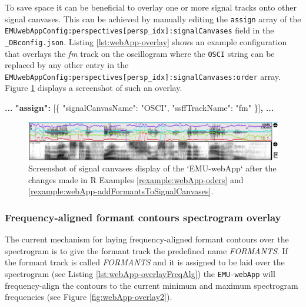 \documentclass[]{book}
\newenvironment{Shaded}{\begin{snugshade}}{\end{snugshade}}
\newcommand{\DataTypeTok}[1]{\textcolor[rgb]{0.13,0.29,0.53}{#1}}
\newcommand{\ErrorTok}[1]{\textcolor[rgb]{0.64,0.00,0.00}{\textbf{#1}}}
\newcommand{\FunctionTok}[1]{\textcolor[rgb]{0.00,0.00,0.00}{#1}}
\newcommand{\OtherTok}[1]{\textcolor[rgb]{0.56,0.35,0.01}{#1}}
\newcommand{\StringTok}[1]{\textcolor[rgb]{0.31,0.60,0.02}{#1}}
\theoremstyle{definition}
\theoremstyle{definition}
\theoremstyle{definition}
\theoremstyle{remark}
\begin{document}
To save space it can be beneficial to overlay one or more signal tracks
onto other signal canvases. This can be achieved by manually editing the
\texttt{assign} array of the
\texttt{EMUwebAppConfig:perspectives{[}persp\_idx{]}:signalCanvases}
field in the \texttt{\_DBconfig.json}. Listing \ref{lst:webApp-overlay}
shows an example configuration that overlays the \emph{fm} track on the
oscillogram where the \texttt{OSCI} string can be replaced by any other
entry in the
\texttt{EMUwebAppConfig:perspectives{[}persp\_idx{]}:signalCanvases:order}
array. Figure \ref{fig:webApp-overlay1} displays a screenshot of such an
overlay.

\begin{Shaded}
\begin{Highlighting}[]
\ErrorTok{...}
\ErrorTok{"assign":} \OtherTok{[}\FunctionTok{\{}
    \DataTypeTok{"signalCanvasName"}\FunctionTok{:} \StringTok{"OSCI"}\FunctionTok{,}
    \DataTypeTok{"ssffTrackName"}\FunctionTok{:} \StringTok{"fm"}
\FunctionTok{\}}\OtherTok{]}\ErrorTok{,}
\ErrorTok{...}
\end{Highlighting}
\end{Shaded}

\begin{figure}

{\centering \includegraphics[width=1\linewidth]{pics/emu-webAppOverlay} 

}

\caption{Screenshot of signal canvases display of the `EMU-webApp` after the changes made in R Examples \ref{rexample:webApp-oders} and \ref{rexample:webApp-addFormantsToSignalCanvases}.}\label{fig:webApp-overlay1}
\end{figure}

\hypertarget{subsubsec:emu-webAppFreqAlignedFormants}{%
\subsubsection{Frequency-aligned formant contours spectrogram
overlay}\label{subsubsec:emu-webAppFreqAlignedFormants}}

The current mechanism for laying frequency-aligned formant contours over
the spectrogram is to give the formant track the predefined name
\emph{FORMANTS}. If the formant track is called \emph{FORMANTS} and it
is assigned to be laid over the spectrogram (see Listing
\ref{lst:webApp-overlayFreqAlg}) the \texttt{EMU-webApp} will
frequency-align the contours to the current minimum and maximum
spectrogram frequencies (see Figure \ref{fig:webApp-overlay2}).
\end{document}
